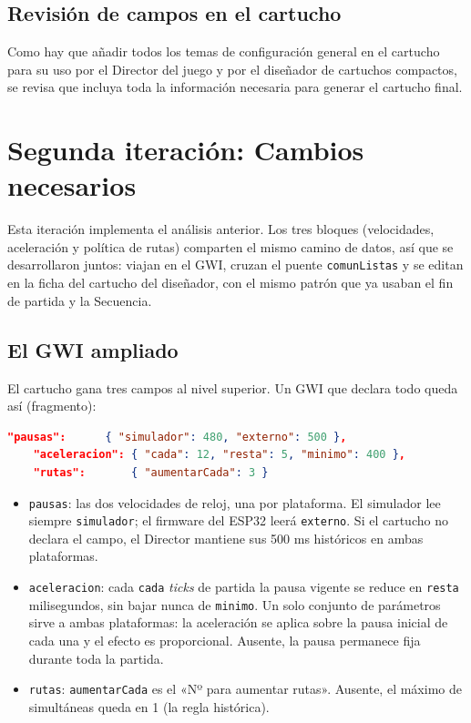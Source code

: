 \subsection{Revisión de campos en el cartucho}

Como hay que añadir todos los temas de configuración general en el
cartucho para su uso por el Director del juego y por el diseñador de
cartuchos compactos, se revisa que incluya toda la información
necesaria para generar el cartucho final.

\section{Segunda iteración: Cambios necesarios}
\label{sec:F4I2}

Esta iteración implementa el análisis anterior. Los tres bloques
(velocidades, aceleración y política de rutas) comparten el mismo
camino de datos, así que se desarrollaron juntos: viajan en el GWI,
cruzan el puente \texttt{comunListas} y se editan en la ficha del
cartucho del diseñador, con el mismo patrón que ya usaban el fin de
partida y la Secuencia.

\subsection{El GWI ampliado}

El cartucho gana tres campos al nivel superior. Un GWI que declara
todo queda así (fragmento):

\begin{lstlisting}[language=json, caption={Campos del Director en el
		GWI (fragmento).}]
	"pausas":      { "simulador": 480, "externo": 500 },
	"aceleracion": { "cada": 12, "resta": 5, "minimo": 400 },
	"rutas":       { "aumentarCada": 3 }
\end{lstlisting}

\begin{itemize}
	\item \texttt{pausas}: las dos velocidades de reloj, una por
	plataforma. El simulador lee siempre \texttt{simulador}; el firmware
	del ESP32 leerá \texttt{externo}. Si el cartucho no declara el campo,
	el Director mantiene sus 500 ms históricos en ambas plataformas.
	\item \texttt{aceleracion}: cada \texttt{cada} \textit{ticks} de
	partida la pausa vigente se reduce en \texttt{resta} milisegundos,
	sin bajar nunca de \texttt{minimo}. Un solo conjunto de parámetros
	sirve a ambas plataformas: la aceleración se aplica sobre la pausa
	inicial de cada una y el efecto es proporcional. Ausente, la pausa
	permanece fija durante toda la partida.
	\item \texttt{rutas}: \texttt{aumentarCada} es el «Nº para aumentar
	rutas». Ausente, el máximo de simultáneas queda en 1 (la regla
	histórica).
\end{itemize}

